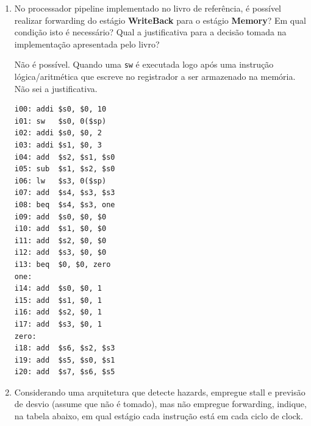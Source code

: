 \documentclass{article}
\begin{document}
\begin{enumerate}
\noindent "Limpar" ou "resetar" um registrador de pipeline corresponde a forçar o valor 0 em todos os sinais armazenados nele. Isso impede a propagação da instrução porque desabilita a escrita em todos os componentes posteriores e acessa, restritamente, o endereço 0 do banco de registradores, habilitado somente para leitura.
\bigbreak

\item No processador pipeline implementado no livro de referência, é possível realizar forwarding do estágio \textbf{WriteBack} para o estágio \textbf{Memory}? Em qual condição isto é necessário? Qual a justificativa para a decisão tomada na implementação apresentada pelo livro?

\noindent Não é possível. Quando uma \verb|sw| é executada logo após uma instrução lógica/aritmética que escreve no registrador a ser armazenado na memória. Não sei a justificativa.

\begin{center}
    \begin{minipage}{0.475\textwidth}
        \begin{lstlisting}[frame=single]
i00: addi $s0, $0, 10
i01: sw   $s0, 0($sp)
i02: addi $s0, $0, 2
i03: addi $s1, $0, 3
i04: add  $s2, $s1, $s0
i05: sub  $s1, $s2, $s0
i06: lw   $s3, 0($sp)
i07: add  $s4, $s3, $s3
i08: beq  $s4, $s3, one
i09: add  $s0, $0, $0
i10: add  $s1, $0, $0
i11: add  $s2, $0, $0
i12: add  $s3, $0, $0
i13: beq  $0, $0, zero
one:
i14: add  $s0, $0, 1
i15: add  $s1, $0, 1
i16: add  $s2, $0, 1
i17: add  $s3, $0, 1
zero:
i18: add  $s6, $s2, $s3
i19: add  $s5, $s0, $s1
i20: add  $s7, $s6, $s5
        \end{lstlisting}
    \end{minipage}
\end{center}

\item Considerando uma arquitetura que detecte hazards, empregue stall e previsão de desvio (assume que não é tomado), mas não empregue forwarding, indique, na tabela abaixo, em qual estágio cada instrução está em cada ciclo de clock.


\end{enumerate}
\end{document}
